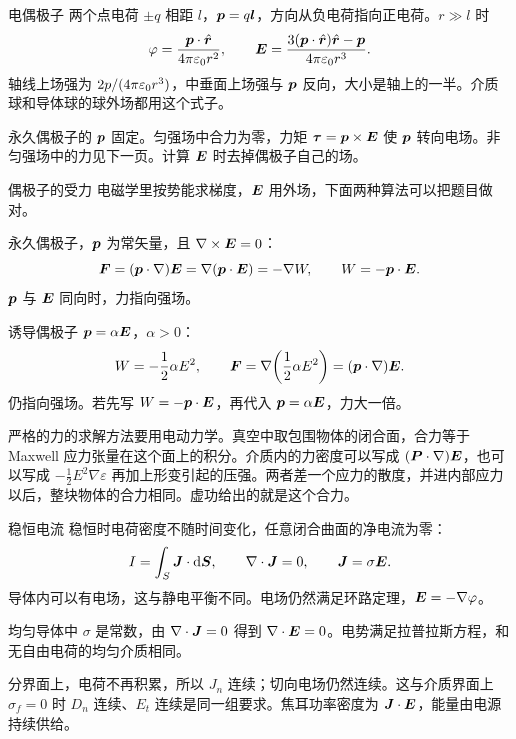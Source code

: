\begin{frame}{电偶极子}
两个点电荷 $\pm q$ 相距 $l$，$\bm{p}=q\bm{l}$，方向从负电荷指向正电荷。$r\gg l$ 时
\[
 \varphi=\frac{\bm{p}\cdot\hat{\bm{r}}}{4\pi\varepsilon_0 r^2},\qquad
 \bm{E}=\frac{3(\bm{p}\cdot\hat{\bm{r}})\hat{\bm{r}}-\bm{p}}{4\pi\varepsilon_0 r^3}.
\]
轴线上场强为 $2p/(4\pi\varepsilon_0 r^3)$，中垂面上场强与 $\bm{p}$ 反向，大小是轴上的一半。介质球和导体球的球外场都用这个式子。

永久偶极子的 $\bm{p}$ 固定。匀强场中合力为零，力矩 $\bm{\tau}=\bm{p}\times\bm{E}$ 使 $\bm{p}$ 转向电场。非匀强场中的力见下一页。计算 $\bm{E}$ 时去掉偶极子自己的场。
\end{frame}

\begin{frame}{偶极子的受力}
电磁学里按势能求梯度，$\bm{E}$ 用外场，下面两种算法可以把题目做对。

永久偶极子，$\bm{p}$ 为常矢量，且 $\nabla\times\bm{E}=0$：
\[
 \bm{F}=(\bm{p}\cdot\nabla)\bm{E}
 =\nabla(\bm{p}\cdot\bm{E})
 =-\nabla W,
 \qquad
 W=-\bm{p}\cdot\bm{E}.
\]
$\bm{p}$ 与 $\bm{E}$ 同向时，力指向强场。

诱导偶极子 $\bm{p}=\alpha\bm{E}$，$\alpha>0$：
\[
 W=-\frac12\alpha E^2,
 \qquad
 \bm{F}=\nabla\!\left(\frac12\alpha E^2\right)
 =(\bm{p}\cdot\nabla)\bm{E}.
\]
仍指向强场。若先写 $W=-\bm{p}\cdot\bm{E}$，再代入 $\bm{p}=\alpha\bm{E}$，力大一倍。

严格的力的求解方法要用电动力学。真空中取包围物体的闭合面，合力等于 Maxwell 应力张量在这个面上的积分。介质内的力密度可以写成 $(\bm{P}\cdot\nabla)\bm{E}$，也可以写成 $-\frac12 E^2\nabla\varepsilon$ 再加上形变引起的压强。两者差一个应力的散度，并进内部应力以后，整块物体的合力相同。虚功给出的就是这个合力。
\end{frame}

\begin{frame}{稳恒电流}
稳恒时电荷密度不随时间变化，任意闭合曲面的净电流为零：
\[
 I=\int_S\bm{J}\cdot\mathop{}\!\mathrm d\bm{S},\qquad
 \nabla\cdot\bm{J}=0,\qquad
 \bm{J}=\sigma\bm{E}.
\]
导体内可以有电场，这与静电平衡不同。电场仍然满足环路定理，$\bm{E}=-\nabla\varphi$。

均匀导体中 $\sigma$ 是常数，由 $\nabla\cdot\bm{J}=0$ 得到 $\nabla\cdot\bm{E}=0$。电势满足拉普拉斯方程，和无自由电荷的均匀介质相同。

分界面上，电荷不再积累，所以 $J_n$ 连续；切向电场仍然连续。这与介质界面上 $\sigma_f=0$ 时 $D_n$ 连续、$E_t$ 连续是同一组要求。焦耳功率密度为 $\bm{J}\cdot\bm{E}$，能量由电源持续供给。
\end{frame}

